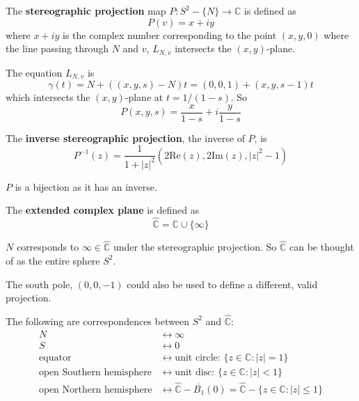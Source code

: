 \begin{definition}
	The \textbf{stereographic projection} map $P: S^2 - \{ N \} \rightarrow \mathbb{C}$ is defined as
	\[
		P(v) = x + iy
	\]
	where $x + iy$ is the complex number corresponding to the point $(x, y, 0)$ where the line passing through $N$ and $v$, $L_{N, v}$ intersects the $(x, y)$-plane.
	
	The equation $L_{N, v}$ is
	\[
		\gamma(t) = N + ((x, y, s) - N) t = (0, 0, 1) + (x, y, s - 1) t
	\]
	which intersects the $(x, y)$-plane at $t = 1 / (1 - s)$. So
	\[
		P(x, y, s) = \frac{x}{1 - s} + i \frac{y}{1 - s}
	\]
\end{definition}

\begin{definition}
	The \textbf{inverse stereographic projection}, the inverse of $P$, is
	\[
		P^{-1}(z) = \frac{1}{1 + |z|^2} (2 \text{Re}(z), 2 \text{Im} (z), |z|^2 - 1)
	\]
\end{definition}

\begin{remark}
	$P$ is a bijection as it has an inverse.
\end{remark}

\begin{definition}
	The \textbf{extended complex plane} is defined as
	\[
		\hat{\mathbb{C}} = \mathbb{C} \cup \{ \infty \}
	\]
\end{definition}

\begin{remark}
	$N$ corresponds to $\infty \in \hat{\mathbb{C}}$ under the stereographic projection. So $\hat{\mathbb{C}}$ can be thought of as the entire sphere $S^2$.
\end{remark}

\begin{remark}
	The south pole, $(0, 0, -1)$ could also be used to define a different, valid projection.
\end{remark}

\begin{proposition}
	The following are correspondences between $S^2$ and $\hat{\mathbb{C}}$:
	\[
		\begin{aligned}
			N & \longleftrightarrow \infty \\
			S & \longleftrightarrow 0 \\
			\text{equator} & \longleftrightarrow \text{unit circle: } \{ z \in \mathbb{C}: |z| = 1 \} \\
			\text{open Southern hemisphere} & \longleftrightarrow \text{unit disc: } \{ z \in \mathbb{C}: |z| < 1 \} \\
			\text{open Northern hemisphere} & \longleftrightarrow \hat{\mathbb{C}} - \overline{B_1}(0) = \hat{\mathbb{C}} - \{ z \in \mathbb{C}: |z| \le 1 \} \\
		\end{aligned}
	\]
\end{proposition}

